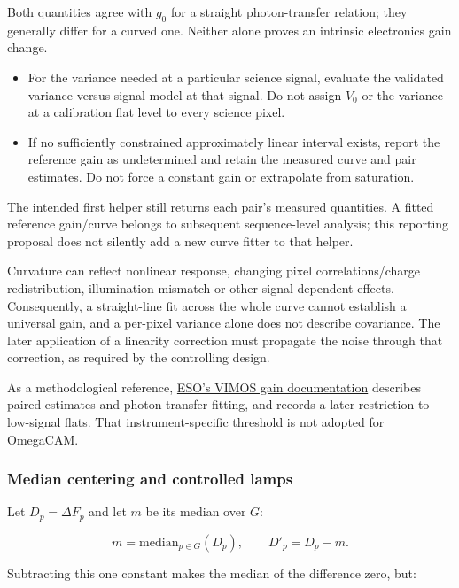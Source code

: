 \documentclass[
  10pt,
  a4paper,
]{article}
\begin{document}
Both quantities agree with \(g_0\) for a straight photon-transfer
relation; they generally differ for a curved one. Neither alone proves
an intrinsic electronics gain change.

\begin{itemize}
\item
  For the variance needed at a particular science signal, evaluate the
  validated variance-versus-signal model at that signal. Do not assign
  \(V_0\) or the variance at a calibration flat level to every science
  pixel.
\item
  If no sufficiently constrained approximately linear interval exists,
  report the reference gain as undetermined and retain the measured
  curve and pair estimates. Do not force a constant gain or extrapolate
  from saturation.
\end{itemize}

The intended first helper still returns each pair's measured quantities.
A fitted reference gain/curve belongs to subsequent sequence-level
analysis; this reporting proposal does not silently add a new curve
fitter to that helper.

Curvature can reflect nonlinear response, changing pixel
correlations/charge redistribution, illumination mismatch or other
signal-dependent effects. Consequently, a straight-line fit across the
whole curve cannot establish a universal gain, and a per-pixel variance
alone does not describe covariance. The later application of a linearity
correction must propagate the noise through that correction, as required
by the controlling design.

As a methodological reference,
\href{https://www.eso.org/observing/dfo/quality/VIMOS/qc/detlin_qc1.html}{ESO's
VIMOS gain documentation} describes paired estimates and photon-transfer
fitting, and records a later restriction to low-signal flats. That
instrument-specific threshold is not adopted for OmegaCAM.

\hypertarget{median-centering-and-controlled-lamps}{%
\subsubsection{Median centering and controlled
lamps}\label{median-centering-and-controlled-lamps}}

Let \(D_p=\Delta F_p\) and let \(m\) be its median over \(G\):

\[
m=\mathrm{median}_{p\in G}(D_p),
\qquad D'_p=D_p-m.
\]

Subtracting this one constant makes the median of the difference zero,
but:
\end{document}
